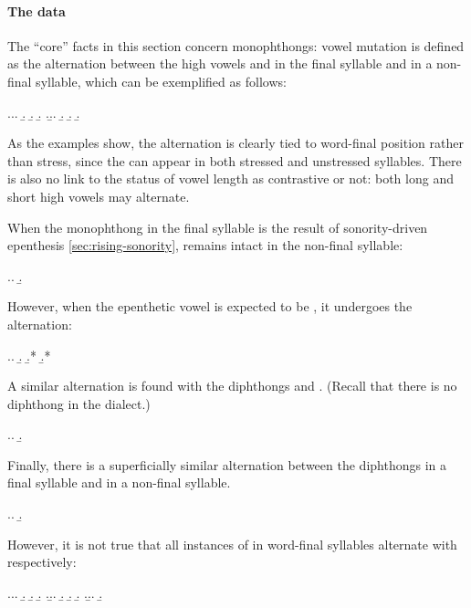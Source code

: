 \paragraph{The data}
\label{sec:data-4}

The \enquote{core} facts in this section concern monophthongs: vowel mutation is defined as the alternation between the high vowels \ipa{[i(ː)]} and \ipa{[u(ː)]} in the final syllable and \ipa{[ə]} in a non-final syllable, which can be exemplified as follows:

\ex.\a.\a.
\b.
\b.
\b.
\z.\b.\a.
\b.
\b.
\b.

As the examples show, the alternation is clearly tied to word-final position rather than stress, since the \ipa{[ə]} can appear in both stressed and
unstressed syllables. There is also no link to the status of vowel length as contrastive or not: both long and short high vowels may alternate.

When the monophthong in the final syllable is the result of sonority\hyp driven epenthesis \cref{sec:rising-sonority}, \ipa{[u]} remains intact in the non-final syllable:

\ex.\a.
\b.

However, when the epenthetic vowel is expected to be \ipa{[ə]}, it undergoes the alternation:

\ex.\a.
\b.
\b.*\mbi{[ˈɬivir]}
\b.*\mbi{[ˈɬəvər]}

A similar alternation is found with the diphthongs \ipa{[iu]} and \ipa{[əu]}. (Recall that there is no \ipa{[əi]} diphthong in the dialect.)

\ex.\a.
\b.

Finally, there is a superficially similar alternation between the diphthongs \ipa{[ai]} in a final syllable and \ipa{[ei]} in a non\hyp final syllable.

\ex.\a.
\b.

However, it is not true that all instances of \ipa{[i~u~iu]} in word\hyp final syllables alternate with \ipa{[ə~ə~əu]} respectively:

\ex.\a.\a.
\b.
\b.
\b.
\z.\b.\a.
\b.
\b.
\b.
\z.\b.\a.
\b.

